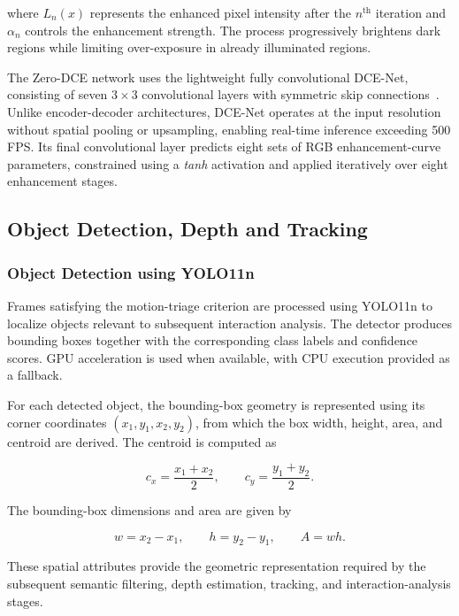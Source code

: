 \documentclass[runningheads]{llncs}
\begin{document}
where $L_n(x)$ represents the enhanced pixel intensity after the
$n^{\text{th}}$ iteration and $\alpha_n$ controls the enhancement strength.
The process progressively brightens dark regions while limiting
over-exposure in already illuminated regions.

The Zero-DCE network uses the lightweight fully convolutional DCE-Net,
consisting of seven $3\times3$ convolutional layers with symmetric skip
connections~\cite{zerodce}. Unlike encoder-decoder architectures, DCE-Net
operates at the input resolution without spatial pooling or upsampling,
enabling real-time inference exceeding 500 FPS. Its final convolutional
layer predicts eight sets of RGB enhancement-curve parameters, constrained
using a \textit{tanh} activation and applied iteratively over eight
enhancement stages.

\subsection{Object Detection, Depth and Tracking}

\subsubsection{Object Detection using YOLO11n}

Frames satisfying the motion-triage criterion are processed using
YOLO11n \cite{yolov11} to localize objects relevant to subsequent interaction analysis.
The detector produces bounding boxes together with the corresponding
class labels and confidence scores. GPU acceleration is used when
available, with CPU execution provided as a fallback.

For each detected object, the bounding-box geometry is represented using
its corner coordinates $(x_1,y_1,x_2,y_2)$, from which the box width,
height, area, and centroid are derived. The centroid is computed as

\begin{equation}
c_x = \frac{x_1+x_2}{2}, \qquad
c_y = \frac{y_1+y_2}{2}.
\end{equation}

The bounding-box dimensions and area are given by

\begin{equation}
w=x_2-x_1,\qquad
h=y_2-y_1,\qquad
A=w h.
\end{equation}

These spatial attributes provide the geometric representation required
by the subsequent semantic filtering, depth estimation, tracking, and
interaction-analysis stages.
\end{document}
